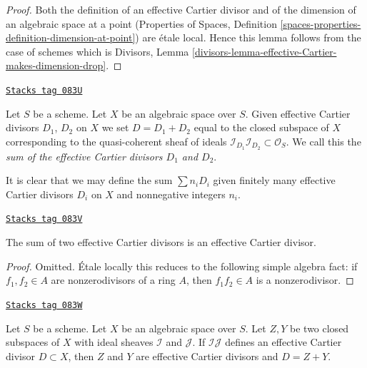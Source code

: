 \begin{proof}
Both the definition of an effective Cartier divisor and of the
dimension of an algebraic space at a point
(Properties of Spaces, Definition
\ref{spaces-properties-definition-dimension-at-point})
are \'etale local. Hence this lemma follows from the case of schemes
which is
Divisors, Lemma \ref{divisors-lemma-effective-Cartier-makes-dimension-drop}.
\end{proof}

\begin{definition}
\label{spaces-divisors-definition-sum-effective-Cartier-divisors}
\href{https://stacks.math.columbia.edu/tag/083U}{\texttt{Stacks tag 083U}}

Let $S$ be a scheme. Let $X$ be an algebraic space over $S$.
Given effective Cartier divisors
$D_1$, $D_2$ on $X$ we set $D = D_1 + D_2$ equal to the
closed subspace of $X$ corresponding to the quasi-coherent
sheaf of ideals
$\mathcal{I}_{D_1}\mathcal{I}_{D_2} \subset \mathcal{O}_S$.
We call this the {\it sum of the effective Cartier divisors
$D_1$ and $D_2$}.
\end{definition}

It is clear that we may define the sum $\sum n_iD_i$ given
finitely many effective Cartier divisors $D_i$ on $X$
and nonnegative integers $n_i$.

\begin{lemma}
\label{spaces-divisors-lemma-sum-effective-Cartier-divisors}
\href{https://stacks.math.columbia.edu/tag/083V}{\texttt{Stacks tag 083V}}

The sum of two effective Cartier divisors is an effective
Cartier divisor.
\end{lemma}

\begin{proof}
Omitted. \'Etale locally this reduces to the following simple
algebra fact: if $f_1, f_2 \in A$ are nonzerodivisors of a ring $A$, then
$f_1f_2 \in A$ is a nonzerodivisor.
\end{proof}

\begin{lemma}
\label{spaces-divisors-lemma-sum-closed-subschemes-effective-Cartier}
\href{https://stacks.math.columbia.edu/tag/083W}{\texttt{Stacks tag 083W}}

Let $S$ be a scheme. Let $X$ be an algebraic space over $S$.
Let $Z, Y$ be two closed subspaces of $X$
with ideal sheaves $\mathcal{I}$ and $\mathcal{J}$. If $\mathcal{I}\mathcal{J}$
defines an effective Cartier divisor $D \subset X$, then $Z$ and $Y$
are effective Cartier divisors and $D = Z + Y$.
\end{lemma}

